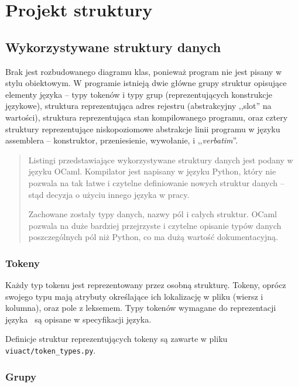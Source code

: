 \section{Projekt struktury}

\subsection{Wykorzystywane struktury danych}

Brak jest rozbudowanego diagramu klas, ponieważ program nie jest pisany w stylu obiektowym.
W programie istnieją dwie główne grupy struktur opisujące elementy języka -- typy tokenów i typy grup
(reprezentujących konstrukcje językowe), struktura reprezentująca adres rejestru (abstrakcyjny ,,slot'' na
wartości), struktura reprezentująca stan kompilowanego programu, oraz cztery struktury reprezentujące
niskopoziomowe abstrakcje linii programu w języku assemblera -- konstruktor, przeniesienie, wywołanie, i
,,\emph{verbatim}''.

\begin{quote}
    Listingi przedstawiające wykorzystywane struktury danych jest podany w języku OCaml.
    Kompilator jest napisany w języku Python, który nie pozwala na tak łatwe i czytelne definiowanie
    nowych struktur danych -- stąd decyzja o użyciu innego języka w pracy.

    Zachowane zostały typy danych, nazwy pól i całych struktur. OCaml pozwala na duże bardziej
    przejrzyste i czytelne opisanie typów danych poszczególnych pól niż Python, co ma dużą
    wartość dokumentacyjną.
\end{quote}

\subsubsection{Tokeny}
\label{diagram_klas_tokeny}

Każdy typ tokenu jest reprezentowany przez osobną strukturę. Tokeny, oprócz swojego typu mają atrybuty
określające ich lokalizację w pliku (wiersz i kolumna), oraz pole z leksemem. Typy tokenów wymagane do
reprezentacji języka \ViuAct\ są opisane w specyfikacji języka.

Definicje struktur reprezentujących tokeny są zawarte w pliku \texttt{viuact/token\_types.py}.

\subsubsection{Grupy}
\label{diagram_klas_grupy}

